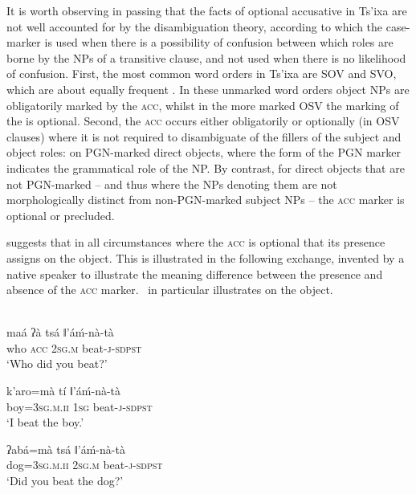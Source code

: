 \documentclass[output=paper]{LSP/langsci}
\begin{document}
It is worth observing in passing that the facts of optional accusative  in Ts’ixa are not well accounted for by the disambiguation theory, according to which the case-marker is used when there is a possibility of confusion between which roles are borne by the NPs of a transitive clause, and not used when there is no likelihood of confusion. First, the most common word orders in Ts’ixa are SOV and SVO, which are about equally frequent \citep[214]{Fehn2014Grammar}. In these unmarked word orders  object NPs are obligatorily marked by the \textsc{acc}, whilst in the more marked OSV  the marking of the  is optional. Second, the \textsc{acc} occurs either obligatorily or optionally (in OSV clauses) where it is not required to disambiguate of the fillers of the subject and object roles: on PGN-marked direct objects, where the form of the PGN marker indicates the grammatical role of the NP. By contrast, for direct objects that are not PGN-marked – and thus where the NPs denoting them are not morphologically distinct from non-PGN-marked subject NPs – the \textsc{acc} marker is optional or precluded.

\citet{Fehn2014Grammar} suggests that in all circumstances where the \textsc{acc} is optional that its presence assigns  on the object. This is illustrated in the following exchange, invented by a native speaker to illustrate the meaning difference between the presence and absence of the \textsc{acc} marker.~ in particular illustrates  on the object.

\newpage 
\ea {}\\%
\ea  \label{09-mc-ex:24}
\gll maá ʔà tsá ǁ’áḿ-nà-tà\\
who \textsc{acc} 2\textsc{sg.m} beat-\textsc{j}-\textsc{sdpst}\\
\glt ‘Who did you beat?’

\ex  \label{09-mc-ex:25}
\gll k’aro=mà tí ǁ’áḿ-nà-tà\\
boy=3\textsc{sg}.\textsc{m.ii} 1\textsc{sg} beat-\textsc{j}-\textsc{sdpst}\\
\glt ‘I beat the boy.’

\ex  \label{09-mc-ex:26}
\gll ʔabá=mà tsá ǁ’áḿ-nà-tà\\
dog=3\textsc{sg}.\textsc{m.ii} 2\textsc{sg.m} beat-\textsc{j}-\textsc{sdpst}\\
\glt ‘Did you beat the dog?’
\end{document}
